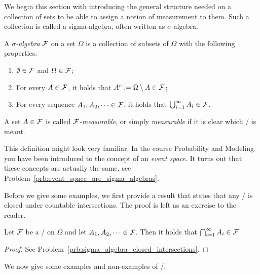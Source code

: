 We begin this section with introducing the general structure needed on a collection of sets to be able to assign a notion of measurement to them. Such a collection is called a sigma-algebra, often written as $\sigma$-algebra.

\begin{definition}\label{def:sigma_algebra}
A \emph{$\sigma$-algebra} $\mathcal F$ on a set $\Omega$ is a collection of subsets of $\Omega$ with the following properties:
\begin{enumerate}
\item $\emptyset \in \mathcal F$ and $\Omega \in \mathcal F$;
\item For every $A \in \mathcal F$, it holds that $A^c := \Omega \setminus A \in \mathcal F$;
\item For every sequence $A_1, A_2, \dots \in \mathcal F$, it holds that $\bigcup_{i = 1}^\infty A_i \in \mathcal F$.
\end{enumerate}
A set $A \in \mathcal F$ is called \emph{$\mathcal F$-measurable}, or simply \emph{measurable} if it is clear which \sigalg/ is meant.
\end{definition}

This definition might look very familiar. In the course Probability and Modeling you have been introduced to the concept of an \emph{event space}. It turns out that these concepts are actually the same, see Problem~\ref{prb:event_space_are_sigma_algebras}.

Before we give some examples, we first provide a result that states that any \sigalg/ is closed under countable intersections. The proof is left as an exercise to the reader.

\begin{lemma}\label{lem:sigma_algebra_closed_intersections}
Let $\mathcal F$ be a \sigalg/ on $\Omega$ and let $A_1, A_2, \dots \in \mathcal F$. Then it holds that $\bigcap_{i = 1}^\infty A_i \in \mathcal F$
\end{lemma}

\begin{proof}
See Problem~\ref{prb:sigma_algebra_closed_intersections}.
\end{proof}

We now give some examples and non-examples of \sigalgs/.

